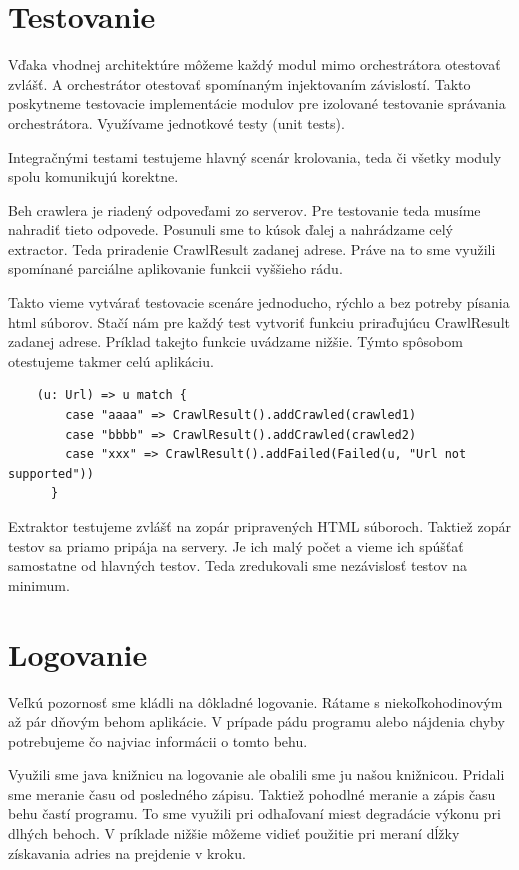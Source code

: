 \section{Testovanie}
Vďaka vhodnej architektúre môžeme každý modul mimo orchestrátora otestovať zvlášť. A orchestrátor otestovať spomínaným injektovaním závislostí. Takto poskytneme testovacie implementácie modulov pre izolované testovanie správania  orchestrátora. Využívame jednotkové testy (unit tests). 

Integračnými testami testujeme hlavný scenár krolovania, teda či všetky moduly spolu komunikujú korektne. 

Beh crawlera je riadený odpoveďami zo serverov. Pre testovanie teda musíme nahradiť tieto odpovede. Posunuli sme to kúsok ďalej a nahrádzame celý extractor. Teda priradenie CrawlResult zadanej adrese. Práve na to sme využili spomínané parciálne aplikovanie funkcii vyššieho rádu.

Takto vieme vytvárať testovacie scenáre jednoducho, rýchlo a bez potreby písania html súborov. Stačí nám pre každý test vytvoriť funkciu priraďujúcu CrawlResult zadanej adrese. Príklad takejto funkcie uvádzame nižšie. Týmto spôsobom otestujeme takmer celú aplikáciu.

\begin{lstlisting}
    (u: Url) => u match {
        case "aaaa" => CrawlResult().addCrawled(crawled1)
        case "bbbb" => CrawlResult().addCrawled(crawled2)
        case "xxx" => CrawlResult().addFailed(Failed(u, "Url not supported"))
      }
\end{lstlisting}


Extraktor testujeme zvlášť na zopár pripravených HTML súboroch. Taktiež zopár testov sa priamo pripája na servery. Je ich malý počet a vieme ich spúšťať samostatne od hlavných testov. Teda zredukovali sme nezávislosť testov na minimum. 

\section{Logovanie}
Veľkú pozornosť sme kládli na dôkladné logovanie. Rátame s niekoľkohodinovým až pár dňovým behom aplikácie. V prípade pádu programu alebo nájdenia chyby potrebujeme čo najviac informácii o tomto behu.

Využili sme java knižnicu na logovanie ale obalili sme ju našou knižnicou. Pridali sme meranie času od posledného zápisu. Taktiež pohodlné meranie a zápis času behu častí programu. To sme využili pri odhaľovaní miest degradácie výkonu pri dlhých behoch. V príklade nižšie môžeme vidieť použitie pri meraní dĺžky získavania adries na prejdenie v kroku. 

